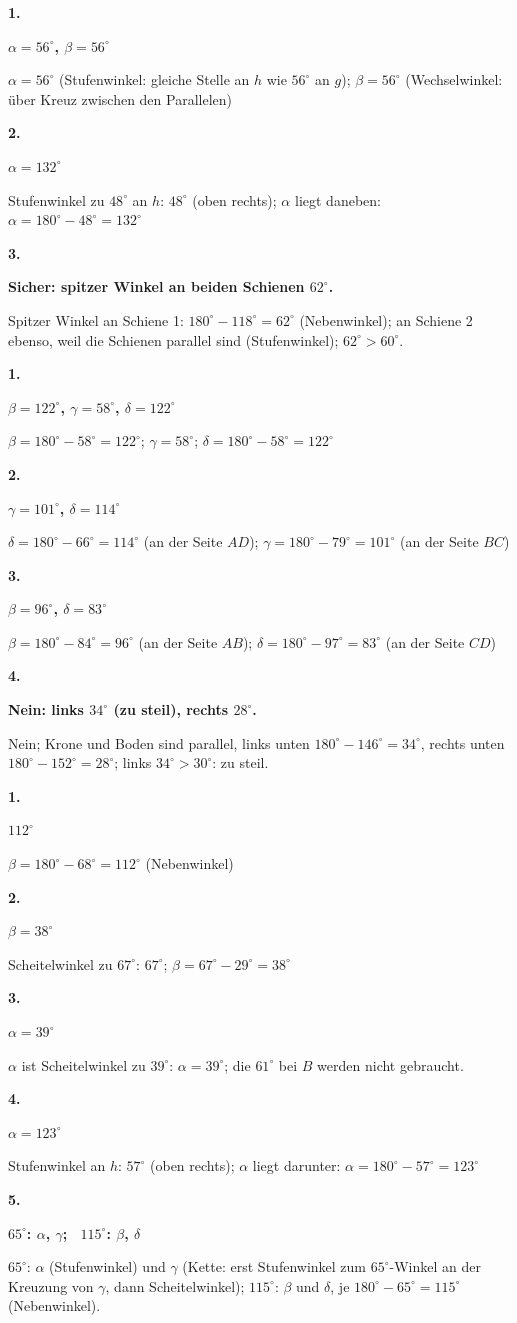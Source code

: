 \documentclass[11pt]{article}
\newcommand{\lsg}[3]{\par\noindent\begin{minipage}[t]{9mm}\textbf{#1}\end{minipage}%
  \begin{minipage}[t]{52mm}\raggedright\bfseries\boldmath #2\end{minipage}\hspace{3mm}%
  \begin{minipage}[t]{\dimexpr\linewidth-64mm\relax}\raggedright\small #3\end{minipage}\par\vspace{4pt}}
\begin{document}
\par\Needspace{25mm}\vspace{6pt}\noindent\colorbox{black!12}{}\hspace{2mm}{\bfseries Winkel an Parallelen}\par\vspace{4pt}
\lsg{1.}{$\alpha = 56^\circ$, $\beta = 56^\circ$}{$\alpha = 56^\circ$ (Stufenwinkel: gleiche Stelle an $h$ wie $56^\circ$ an $g$); $\beta = 56^\circ$ (Wechselwinkel: über Kreuz zwischen den Parallelen)}
\lsg{2.}{$\alpha = 132^\circ$}{Stufenwinkel zu $48^\circ$ an $h$: $48^\circ$ (oben rechts); $\alpha$ liegt daneben: $\alpha = 180^\circ - 48^\circ = 132^\circ$}
\lsg{3.}{Sicher: spitzer Winkel an beiden Schienen $62^\circ$.}{Spitzer Winkel an Schiene 1: $180^\circ - 118^\circ = 62^\circ$ (Nebenwinkel); an Schiene 2 ebenso, weil die Schienen parallel sind (Stufenwinkel); $62^\circ > 60^\circ$.}
\par\Needspace{25mm}\vspace{6pt}\noindent\colorbox{black!12}{}\hspace{2mm}{\bfseries Parallelogramm und Trapez}\par\vspace{4pt}
\lsg{1.}{$\beta = 122^\circ$, $\gamma = 58^\circ$, $\delta = 122^\circ$}{$\beta = 180^\circ - 58^\circ = 122^\circ$; $\gamma = 58^\circ$; $\delta = 180^\circ - 58^\circ = 122^\circ$}
\lsg{2.}{$\gamma = 101^\circ$, $\delta = 114^\circ$}{$\delta = 180^\circ - 66^\circ = 114^\circ$ (an der Seite $AD$); $\gamma = 180^\circ - 79^\circ = 101^\circ$ (an der Seite $BC$)}
\lsg{3.}{$\beta = 96^\circ$, $\delta = 83^\circ$}{$\beta = 180^\circ - 84^\circ = 96^\circ$ (an der Seite $AB$); $\delta = 180^\circ - 97^\circ = 83^\circ$ (an der Seite $CD$)}
\lsg{4.}{Nein: links $34^\circ$ (zu steil), rechts $28^\circ$.}{Nein; Krone und Boden sind parallel, links unten $180^\circ - 146^\circ = 34^\circ$, rechts unten $180^\circ - 152^\circ = 28^\circ$; links $34^\circ > 30^\circ$: zu steil.}
\par\Needspace{25mm}\vspace{6pt}\noindent\colorbox{black!12}{}\hspace{2mm}{\bfseries Probetest}\par\vspace{4pt}
\lsg{1.}{$112^\circ$}{$\beta = 180^\circ - 68^\circ = 112^\circ$ (Nebenwinkel)}
\lsg{2.}{$\beta = 38^\circ$}{Scheitelwinkel zu $67^\circ$: $67^\circ$; $\beta = 67^\circ - 29^\circ = 38^\circ$}
\lsg{3.}{$\alpha = 39^\circ$}{$\alpha$ ist Scheitelwinkel zu $39^\circ$: $\alpha = 39^\circ$; die $61^\circ$ bei $B$ werden nicht gebraucht.}
\lsg{4.}{$\alpha = 123^\circ$}{Stufenwinkel an $h$: $57^\circ$ (oben rechts); $\alpha$ liegt darunter: $\alpha = 180^\circ - 57^\circ = 123^\circ$}
\lsg{5.}{$65^\circ$: $\alpha$, $\gamma$; \ $115^\circ$: $\beta$, $\delta$}{$65^\circ$: $\alpha$ (Stufenwinkel) und $\gamma$ (Kette: erst Stufenwinkel zum $65^\circ$-Winkel an der Kreuzung von $\gamma$, dann Scheitelwinkel); $115^\circ$: $\beta$ und $\delta$, je $180^\circ - 65^\circ = 115^\circ$ (Nebenwinkel).}
\end{document}
